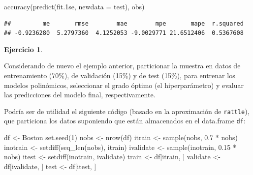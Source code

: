 \documentclass[
  spanish,
]{book}
\newenvironment{Shaded}{\begin{snugshade}}{\end{snugshade}}
\newcommand{\AttributeTok}[1]{\textcolor[rgb]{0.77,0.63,0.00}{#1}}
\newcommand{\DecValTok}[1]{\textcolor[rgb]{0.00,0.00,0.81}{#1}}
\newcommand{\FloatTok}[1]{\textcolor[rgb]{0.00,0.00,0.81}{#1}}
\newcommand{\FunctionTok}[1]{\textcolor[rgb]{0.00,0.00,0.00}{#1}}
\newcommand{\NormalTok}[1]{#1}
\newcommand{\OtherTok}[1]{\textcolor[rgb]{0.56,0.35,0.01}{#1}}
\newcommand{\SpecialCharTok}[1]{\textcolor[rgb]{0.00,0.00,0.00}{#1}}
\theoremstyle{break}
\theoremstyle{definition}
\theoremstyle{definition}
\theoremstyle{definition}
\newtheorem{exercise}{Ejercicio}[chapter]
\theoremstyle{definition}
\theoremstyle{remark}
\begin{document}
\begin{Shaded}
\begin{Highlighting}[]
\FunctionTok{accuracy}\NormalTok{(}\FunctionTok{predict}\NormalTok{(fit}\FloatTok{.1}\NormalTok{se, }\AttributeTok{newdata =}\NormalTok{ test), obs)}
\end{Highlighting}
\end{Shaded}

\begin{verbatim}
##         me       rmse        mae        mpe       mape  r.squared 
## -0.9236280  5.2797360  4.1252053 -9.0029771 21.6512406  0.5367608
\end{verbatim}

\begin{exercise}
\protect\hypertarget{exr:train-validate-test}{}{\label{exr:train-validate-test} }
\end{exercise}

Considerando de nuevo el ejemplo anterior, particionar la muestra en datos de entrenamiento (70\%), de validación (15\%) y de test (15\%), para entrenar los modelos polinómicos, seleccionar el grado óptimo (el hiperparámetro) y evaluar las predicciones del modelo final, respectivamente.

Podría ser de utilidad el siguiente código (basado en la aproximación de \texttt{rattle}), que particiona los datos suponiendo que están almacenados en el data.frame \texttt{df}:

\begin{Shaded}
\begin{Highlighting}[]
\NormalTok{df }\OtherTok{\textless{}{-}}\NormalTok{ Boston}
\FunctionTok{set.seed}\NormalTok{(}\DecValTok{1}\NormalTok{)}
\NormalTok{nobs }\OtherTok{\textless{}{-}} \FunctionTok{nrow}\NormalTok{(df)}
\NormalTok{itrain }\OtherTok{\textless{}{-}} \FunctionTok{sample}\NormalTok{(nobs, }\FloatTok{0.7} \SpecialCharTok{*}\NormalTok{ nobs)}
\NormalTok{inotrain }\OtherTok{\textless{}{-}} \FunctionTok{setdiff}\NormalTok{(}\FunctionTok{seq\_len}\NormalTok{(nobs), itrain)}
\NormalTok{ivalidate }\OtherTok{\textless{}{-}} \FunctionTok{sample}\NormalTok{(inotrain, }\FloatTok{0.15} \SpecialCharTok{*}\NormalTok{ nobs)}
\NormalTok{itest }\OtherTok{\textless{}{-}} \FunctionTok{setdiff}\NormalTok{(inotrain, ivalidate)}
\NormalTok{train }\OtherTok{\textless{}{-}}\NormalTok{ df[itrain, ]}
\NormalTok{validate }\OtherTok{\textless{}{-}}\NormalTok{ df[ivalidate, ]}
\NormalTok{test }\OtherTok{\textless{}{-}}\NormalTok{ df[itest, ]}
\end{Highlighting}
\end{Shaded}
\end{document}
